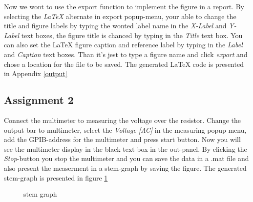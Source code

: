 Now we wont to use the export function to implement the figure in a report. By selecting the \emph{LaTeX} alternate in export popup-menu, your able to change the title and  figure labels  by typing the wonted label name in the \emph{X-Label} and \emph{Y-Label} text boxes, the figure title is chanced by typing in the \emph{Title} text box. You can also set the LaTeX figure caption and reference label by typing in the \emph{Label} and \emph{Caption} text boxes. Than it's jest to type a figure name and click \emph{export} and chose a location for the file to be saved. The generated LaTeX code is presented in Appendix \ref{output} 

\subsection{Assignment 2}
Connect the multimeter to measuring the voltage over the resistor. Change the output bar to multimeter, select the \emph{Voltage [AC]} in the measuring popup-menu, add the GPIB-address for the multimeter and press start button. Now you will see the multimeter display in the black text box in the out-panel. By clicking the \emph{Stop}-button you stop the multimeter and you can save the data in a .mat file and also present the measerment in a stem-graph by saving the figure. The generated stem-graph is presented in figure \ref{stem} 
	\begin{figure}[H]
	\centering
		\caption{stem graph}
		\label{stem}
	\end{figure}

